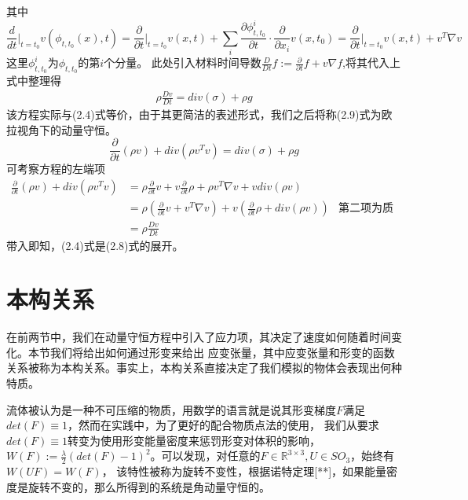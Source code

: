 其中$$\frac{d}{dt}\Big |_{t = t_0} v(\phi_{t,t_0}(x),t) = \frac{\partial}{\partial t}\Big |_{t = t_0}v(x,t) + \sum_i \frac{\partial \phi_{t,t_0}^i}{\partial t}  \cdot \frac{\partial}{\partial x_i}v(x,t_0) = \frac{\partial}{\partial t}\Big |_{t = t_0}v(x,t) + v^T\nabla v$$
这里$\phi_{t,t_0}^i$为$\phi_{t,t_0}$的第$i$个分量。
此处引入材料时间导数$\frac{D}{Dt}f := \frac{\partial}{\partial t} f + v\nabla f $,将其代入上式中整理得
\begin{equation}
    \begin{split}
        \rho \frac{Dv}{Dt} = div(\sigma) + \rho g
    \end{split}
\end{equation}
该方程实际与(2.4)式等价，由于其更简洁的表述形式，我们之后将称(2.9)式为欧拉视角下的动量守恒。
$$\frac{\partial}{\partial t}(\rho v) + div(\rho v^{T}v) = div(\sigma) + \rho g$$
可考察方程的左端项
\begin{align*}
    \frac{\partial}{\partial t}(\rho v) + div(\rho v^{T}v) & = \rho \frac{\partial}{\partial t} v + v \frac{\partial}{\partial t} \rho + \rho v^T\nabla v + v div(\rho v)                           \\
                                                           & = \rho (\frac{\partial}{\partial t} v + v^T\nabla v) + v(\frac{\partial}{\partial t} \rho + div(\rho v))     & \text{第二项为质量守恒} \\
                                                           & = \rho \frac{Dv}{Dt}
\end{align*}
带入即知，(2.4)式是(2.8)式的展开。

\section{本构关系}
在前两节中，我们在动量守恒方程中引入了应力项，其决定了速度如何随着时间变化。本节我们将给出如何通过形变来给出
应变张量，其中应变张量和形变的函数关系被称为本构关系。事实上，本构关系直接决定了我们模拟的物体会表现出何种特质。

流体被认为是一种不可压缩的物质，用数学的语言就是说其形变梯度$F$满足$det(F)\equiv 1$，然而在实践中，为了更好的配合物质点法的使用，
我们从要求$det(F)\equiv 1$转变为使用形变能量密度来惩罚形变对体积的影响，$W(F):= \frac{\lambda}{2} (det(F) - 1)^2$。可以发现，对任意的$F\in \mathbb{R}^{3\times 3}, U\in SO_3$，始终有$W(UF) = W(F)$，
该特性被称为旋转不变性，根据诺特定理[**]，如果能量密度是旋转不变的，那么所得到的系统是角动量守恒的。

